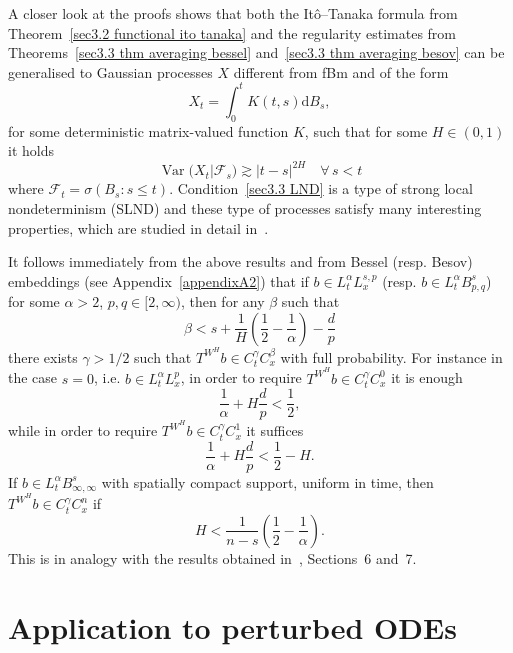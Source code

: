 \documentclass[10pt]{article}
\newcommand{\mathd}{\mathrm{d}}
\newcommand{\nobracket}{}
\newcommand{\tmop}[1]{\ensuremath{\operatorname{#1}}}
\begin{document}
\begin{remark}
  \label{sec3.3 remark lnd}A closer look at the proofs shows that both the
  It\^{o}--Tanaka formula from Theorem~\ref{sec3.2 functional ito tanaka} and
  the regularity estimates from Theorems~\ref{sec3.3 thm averaging bessel}
  and~\ref{sec3.3 thm averaging besov} can be generalised to Gaussian
  processes $X$ different from fBm and of the form
  \[ X_t = \int_0^t K (t, s) \mathd B_s, \]
  for some deterministic matrix\mbox{-}valued function $K$, such that for some
  $H \in (0, 1)$ it holds
  \begin{equation}
    \tmop{Var} (X_t | \mathcal{F}_s \nobracket) \gtrsim | t - s |^{2 H} \quad
    \forall \, s < t \label{sec3.3 LND}
  \end{equation}
  where $\mathcal{F}_t = \sigma (B_s : s \leqslant t)$.
  Condition~{\eqref{sec3.3 LND}} is a type of strong local nondeterminism
  (SLND) and these type of processes satisfy many interesting properties,
  which are studied in detail in~{\cite{galeatigubinelli}}.
\end{remark}

\begin{remark}
  \label{sec3.3 remark embedding}It follows immediately from the above results
  and from Bessel (resp. Besov) embeddings (see Appendix~\ref{appendixA2})
  that if $b \in L^{\alpha}_t L^{s, p}_x$ (resp. $b \in L^{\alpha}_t B^s_{p,
  q}$) for some $\alpha > 2$, $p, q \in [2, \infty)$, then for any $\beta$
  such that
  \begin{equation}
    \beta < s + \frac{1}{H} \left( \frac{1}{2} - \frac{1}{\alpha} \right) -
    \frac{d}{p} \label{sec3.3 eq remark embedding}
  \end{equation}
  there exists $\gamma > 1 / 2$ such that $T^{W^H} b \in C^{\gamma}_t
  C^{\beta}_x$ with full probability. For instance in the case $s = 0$, i.e.
  $b \in L^{\alpha}_t L^p_x$, in order to require $T^{W^H} b \in C^{\gamma}_t
  C^0_x$ it is enough
  \[ \frac{1}{\alpha} + H \frac{d}{p} < \frac{1}{2}, \]
  while in order to require $T^{W^H} b \in C^{\gamma}_t C^1_x$ it suffices
  \[ \frac{1}{\alpha} + H \frac{d}{p} < \frac{1}{2} - H. \]
  If $b \in L^{\alpha}_t B^s_{\infty, \infty}$ with spatially compact support,
  uniform in time, then $T^{W^H} b \in C^{\gamma}_t C^n_x$ if
  \[ H < \frac{1}{n - s} \left( \frac{1}{2} - \frac{1}{\alpha} \right) . \]
  This is in analogy with the results obtained in~{\cite{le}}, Sections~6
  and~7.
\end{remark}

\section{Application to perturbed ODEs}\label{sec4}
\end{document}
